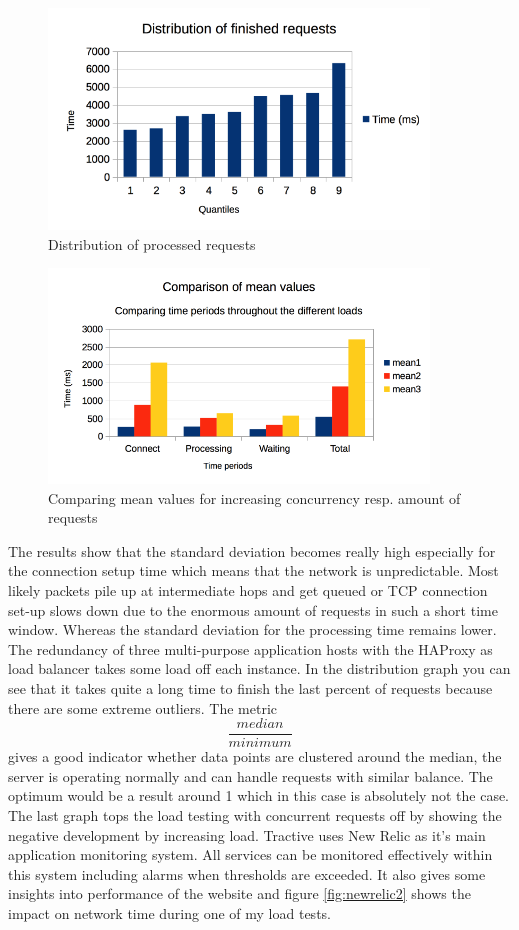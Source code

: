 \begin{figure}[h!]
	\centering
		\includegraphics[width=0.9\textwidth]{imgs/dist_con100.png}
	\caption{Distribution of processed requests}
\end{figure}

\begin{figure}[h!]
	\centering
		\includegraphics[width=0.9\textwidth]{imgs/comparison_mean_values.png}
	\caption{Comparing mean values for increasing concurrency resp. amount of requests}
\end{figure}

The results show that the standard deviation becomes really high especially for the connection setup time which means that the network is unpredictable. Most likely packets pile up at intermediate hops and get queued or TCP connection set-up slows down due to the enormous amount of requests in such a short time window. Whereas the standard deviation for the processing time remains lower. The redundancy of three multi-purpose application hosts with the HAProxy as load balancer takes some load off each instance. In the distribution graph you can see that it takes quite a long time to finish the last percent of requests because there are some extreme outliers. The metric $$\frac{median}{minimum}$$ gives a good indicator whether data points are clustered around the median, the server is operating normally and can handle requests with similar balance. The optimum would be a result around 1 which in this case is absolutely not the case. The last graph tops the load testing with concurrent requests off by showing the negative development by increasing load.
Tractive uses New Relic as it's main application monitoring system. All services can be monitored effectively within this system including alarms when thresholds are exceeded. It also gives some insights into performance of the website and figure \ref{fig:newrelic2} shows the impact on network time during one of my load tests.

